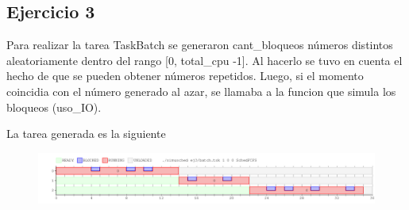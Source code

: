 \subsection{Ejercicio 3}

Para realizar la tarea TaskBatch se generaron cant_bloqueos números distintos aleatoriamente dentro del rango [0, total_cpu -1]. Al hacerlo se tuvo en cuenta el hecho de que se pueden obtener números repetidos.
Luego, si el momento coincidia con el número generado al azar, se llamaba a la funcion que simula los bloqueos (uso_IO).

La tarea generada es la siguiente

\begin{figure}[h]
  \includegraphics[width=\textwidth]{../ej3/salida.png}
  \caption{}
\end{figure}